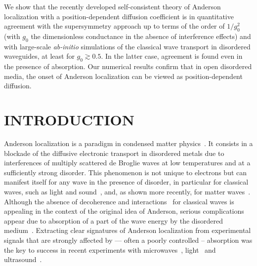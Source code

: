We show that the recently developed self-consistent theory of Anderson localization with a position-dependent diffusion coefficient is in quantitative agreement with the supersymmetry approach up to terms of the order of $1/g_0^2$ (with $g_0$ the dimensionless conductance in the absence of interference effects) and with  large-scale {\it ab-initio} simulations of the classical wave transport in disordered waveguides, at least for $g_0 \gtrsim 0.5$. In the latter case, agreement is found  even in the presence of absorption. Our numerical results confirm that in open disordered media,  the onset of  Anderson localization can be viewed as position-dependent diffusion.
% 
% 


\section{INTRODUCTION}


Anderson localization is a paradigm in condensed matter physics~\cite{1958_Anderson}. It consists in a blockade of the diffusive electronic transport in disordered metals due to interferences of multiply scattered de Broglie waves at low temperatures and at a sufficiently strong disorder. This phenomenon is not unique to electrons but can manifest itself for any wave in the presence of disorder, in particular for classical waves, such as light and sound~\cite{1984_John_prl}, and, as shown more recently, for matter waves~\cite{2008_Billy}. Although the absence of decoherence and interactions~\cite{2007_Akkermans_book} for classical waves is appealing in the context of the original idea of Anderson, serious complications appear due to absorption of a part of the wave energy by the disordered medium~\cite{1991_Genack}.
Extracting clear signatures of Anderson localization from experimental signals that are strongly affected by --- often a poorly controlled -- absorption was the key to success in recent experiments with microwaves~\cite{2000_chabanov_nature,2003_Genack}, light~\cite{2006_Maret_PRL} and ultrasound~\cite{2008_van_Tiggelen_Nature}.

